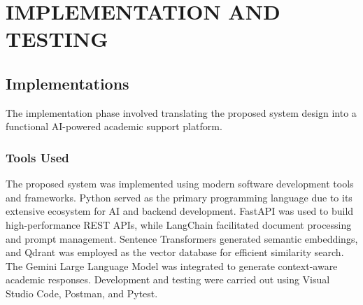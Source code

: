 \chapter{IMPLEMENTATION AND TESTING}
\section{Implementations}
The implementation phase involved translating the proposed system design into a functional AI-powered academic support platform.\par

\subsection{Tools Used}

The proposed system was implemented using modern software development tools and frameworks. Python served as the primary programming language due to its extensive ecosystem for AI and backend development. FastAPI was used to build high-performance REST APIs, while LangChain facilitated document processing and prompt management. Sentence Transformers generated semantic embeddings, and Qdrant was employed as the vector database for efficient similarity search. The Gemini Large Language Model was integrated to generate context-aware academic responses. Development and testing were carried out using Visual Studio Code, Postman, and Pytest. \par

